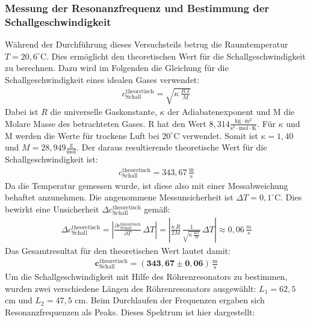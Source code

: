 \documentclass[german,  %
parskip=full,  %
]{scrartcl}
\begin{document}
\subsubsection{Messung der Resonanzfrequenz und Bestimmung der Schallgeschwindigkeit}
Während der Durchführung dieses Versuchsteils betrug die Raumtemperatur $T=20,6^{\circ} \mathrm{C}$. Dies ermöglicht den theoretischen Wert für die Schallgeschwindigkeit zu berechnen. Dazu wird im Folgenden die Gleichung für die Schallgeschwindigkeit eines idealen Gases verwendet:
\begin{align}
c_{\mathrm{Schall}}^{\mathrm{theoretisch}} = \sqrt{\kappa \, \frac{R\, T}{M}}
\end{align}
Dabei ist $R$ die universelle Gaskonstante, $\kappa$ der Adiabatenexponent und M die Molare Masse des betrachteten Gases. R hat den Wert $8,314 \frac{\mathrm{kg} \cdot \mathrm{m}^2}{\mathrm{s}^2 \cdot \mathrm{mol} \cdot \mathrm{K}}$.
Für $\kappa$ und M werden die Werte für trockene Luft bei $20^{\circ}\mathrm{C}$ verwendet. Somit ist $\kappa=1,40$ und $M=28,949 \frac{\mathrm{g}}{\mathrm{mol}}$. Der daraus resultierende theoretische Wert für die Schallgeschwindigkeit ist:
\begin{align}
c_{\mathrm{Schall}}^{\mathrm{theoretisch}}=343,67 \, \frac{\mathrm{m}}{\mathrm{s}}
\end{align}
Da die Temperatur gemessen wurde, ist diese also mit einer Messabweichung behaftet anzunehmen. Die angenommene Messunsicherheit ist $\Delta T=0,1^{\circ} \mathrm{C}$. Dies bewirkt eine Unsicherheit $\Delta c_{\mathrm{Schall}}^{\mathrm{theoretisch}}$ gemäß:
\begin{align}
\Delta c_{\mathrm{Schall}}^{\mathrm{theoretisch}} = \left| \frac{\partial c_{\mathrm{Schall}}^{\mathrm{theoretisch}}}{\partial T} \, \Delta T \right| =\left| \frac{\kappa \, R}{2M}\, \frac{1}{\sqrt{\kappa \, \frac{RT}{M}}} \, \Delta T \right| \approx 0,06\, \frac{m}{s}
\end{align}
Das Gesamtresultat für den theoretischen Wert lautet damit:
\begin{align}
\boldsymbol{c_{\mathrm{Schall}}^{\mathrm{theoretisch}} = (343,67 \pm 0,06) \, \frac{\mathrm{m}}{\mathrm{s}}}
\end{align}
\newline
\newline Um die Schallgeschwindigkeit mit Hilfe des Röhrenresonators zu bestimmen, wurden zwei verschiedene Längen des Röhrenresonators ausgewählt: $L_1=62,5$ cm und $L_{2}=47,5$ cm. Beim Durchlaufen der Frequenzen ergaben sich Resonanzfrequenzen als Peaks. Dieses Spektrum ist hier dargestellt: 
\end{document}
